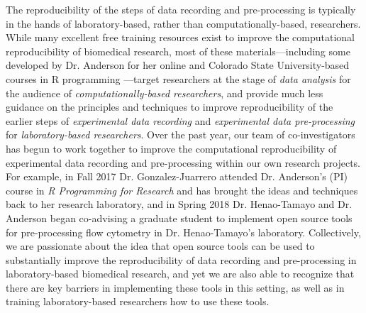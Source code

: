 \documentclass[pdftex,english,11.5pt,parskip=half]{scrartcl}
\begin{document}
The reproducibility of the steps of data recording and pre-processing is typically 
in the hands of laboratory-based, rather than computationally-based, researchers.
While many excellent free training resources exist to improve the computational
reproducibility of biomedical research, most of these
materials---including some developed by Dr. Anderson for her online and
Colorado State University-based courses in R programming \cite{andersoncoursebook, andersonmastering}---target researchers at the stage of
\textit{data analysis} for the audience of \textit{computationally-based researchers}, and provide much less guidance on the principles and
techniques to improve reproducibility of the earlier steps of
\textit{experimental data recording} and \textit{experimental data
pre-processing} for \textit{laboratory-based researchers}. 
Over the past year, our team of co-investigators has begun
to work together to improve the computational reproducibility of experimental data recording and pre-processing within our own research projects. For example, in
Fall 2017 Dr. Gonzalez-Juarrero attended Dr. Anderson's (PI) course in \textit{R
Programming for Research} and has brought the ideas and techniques back to her
research laboratory, and in Spring 2018 Dr. Henao-Tamayo and Dr.
Anderson began co-advising a graduate student to implement
open source tools for pre-processing flow cytometry in Dr. Henao-Tamayo's
laboratory. Collectively, we are passionate about the idea that
open source tools can be used to substantially improve the
reproducibility of data recording and pre-processing in laboratory-based
biomedical research, and yet we are also able to recognize that there are key barriers in
implementing these tools in this setting, as well as in training
laboratory-based researchers how to use these tools. 
\end{document}
